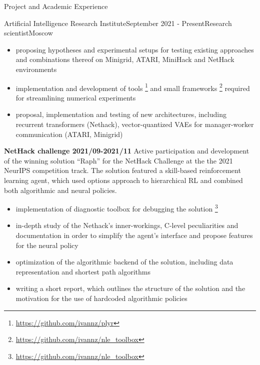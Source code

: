 \documentclass{resume} %
\begin{document}
\begin{rSection}{Project and Academic Experience}
\begin{rSubsection}{Artificial Intelligence Research Institute}{September 2021 - Present}{Research scientist}{Moscow}
\begin{itemize}
        \item proposing hypotheses and experimental setups for testing existing approaches
        and combinations thereof on Minigrid, ATARI, MiniHack and NetHack environments
        
        \item implementation and development of tools%
            \footnote{\url{https://github.com/ivannz/plyr}}
        and small frameworks%
            \footnote{\url{https://github.com/ivannz/nle_toolbox}}
        required for streamlining numerical experiments
        
        \item proposal, implementation and testing of new architectures, including
        recurrent transformers (Nethack), vector-quantized VAEs for manager-worker
        communication (ATARI, Minigrid)
    \end{itemize}

    \medskip
    \item \textbf{NetHack challenge 2021/09-2021/11}
    Active participation and development of the winning solution ``Raph'' for the NetHack
    Challenge at the the 2021 NeurIPS competition track. The solution featured a skill-based
    reinforcement learning agent, which used options approach to hierarchical RL and combined
    both algorithmic and neural policies.
    \begin{itemize}
        \item implementation of diagnostic toolbox for debugging the solution%
            \footnote{\url{https://github.com/ivannz/nle_toolbox}}
        
        \item in-depth study of the Nethack's inner-workings, C-level peculiarities and
        documentation in order to simplify the agent's interface and propose features for
        the neural policy
        
        \item optimization of the algorithmic backend of the solution, including data representation
        and shortest path algorithms
        
        \item writing a short report, which outlines the structure of the solution and
        the motivation for the use of hardcoded algorithmic policies
    \end{itemize}
\end{rSubsection}


\end{rSection}
\end{document}
